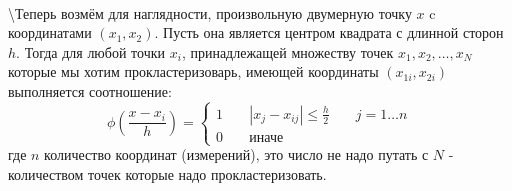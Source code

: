 \documentclass[11pt]{article}
\begin{document}
    \begin{center}
    \end{center}
    { \hspace*{\fill} \\}
    
    \textbackslash{}Теперь возмём для наглядности, произвольную двумерную
точку $x$ c координатами $(x_1, x_2)$. Пусть она является центром
квадрата с длинной сторон $h$. Тогда для любой точки $x_i$,
принадлежащей множеству точек $x_1, x_2, \ldots , x_N$ которые мы хотим
прокластеризоварь, имеющей координаты $(x_{1i}, x_{2i})$ выполняется
соотношение: \[
\phi\left(\frac{x - x_i}{h}\right) = \left\lbrace
            \begin{aligned}
            1 && \; |x_j - x_{ij}| \le \frac{h}{2} && \; j = 1\ldots n \\
            0 && \; \mbox{иначе} &&
           \end{aligned}
          \right.
\] где $n$ количество координат (измерений), это число не надо путать с
$N$ - количеством точек которые надо прокластеризовать.
\end{document}
